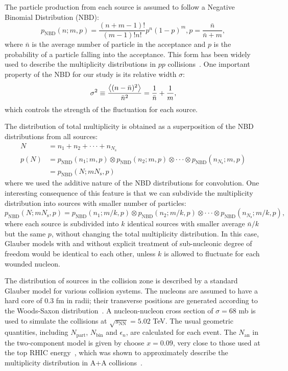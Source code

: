 The particle production from each source is assumed to follow a Negative Binomial Distribution (NBD):
\begin{equation}
p_\text{NBD}(n;m,p) = \frac{(n+m-1)!}{(m-1)!n!} p^n (1-p)^m, p=\frac{\bar{n}}{\bar{n}+m},
\end{equation}
where $\bar{n}$ is the average number of particle in the acceptance and $p$ is the probability of a particle falling into the acceptance. This form has been widely used to describe the multiplicity distributions in $pp$ collisions~\cite{Ghosh:2012xh}. One important property of the NBD for our study is its relative width $\sigma$:
\begin{equation}
\sigma^2 \equiv \frac{\left\langle (n-\bar{n})^2\right\rangle}{\bar{n}^2} = \frac{1}{\bar{n}} + \frac{1}{m},
\end{equation}
which controls the strength of the fluctuation for each source. 

The distribution of total multiplicity is obtained as a superposition of the NBD distributions from all sources:
\begin{equation}
\begin{split}
N &= n_1 + n_2 + \cdot\cdot\cdot + n_{N_\text{s}} \\
p(N) &= p_\text{NBD}(n_1;m,p) \otimes p_\text{NBD}(n_2;m,p) \otimes \cdot\cdot\cdot \otimes p_\text{NBD}(n_{N_\text{s}};m,p) \\
&= p_\text{NBD}(N; mN_\text{s}, p)
\end{split}
\end{equation}
where we used the additive nature of the NBD distributions for convolution. One interesting consequence of this feature is that we can subdivide the multiplicity distribution into sources with smaller number of particles:
\begin{equation}
p_\text{NBD}(N; mN_\text{s}, p) = p_\text{NBD}(n_1; m/k, p) \otimes p_\text{NBD}(n_2; m/k, p) \otimes \cdot\cdot\cdot \otimes p_\text{NBD}(n_{N_\text{s}}; m/k, p),
\end{equation}
where each source is subdivided into $k$ identical sources with smaller average $\bar{n}/k$ but the same $p$, without changing the total multiplicity distribution. In this case, Glauber models with and without explicit treatment of sub-nucleonic degree of freedom would be identical to each other, unless $k$ is allowed to fluctuate for each wounded nucleon.

The distribution of sources in the collision zone is described by a standard Glauber model for various collision systems. The nucleons are assumed to have a hard core of 0.3 fm in radii; their transverse positions are generated according to the Woods-Saxon distribution~\cite{Loizides:2014vua}. A nucleon-nucleon cross section of $\sigma = 68$ mb is used to simulate the collisions at $\sqrt{s_\text{NN}}=5.02$ TeV. The usual geometric quantities, including $N_\text{part}$, $N_\text{bin}$ and $\epsilon_n$, are calculated for each event. The $N_\text{an}$ in the two-component model is given by choose $x=0.09$, very close to those used at the top RHIC energy~\cite{Adler:2013aqf}, which was shown to approximately describe the multiplicity distribution in A+A collisions~\cite{Adler:2013aqf, Abelev:2013qoq}.

